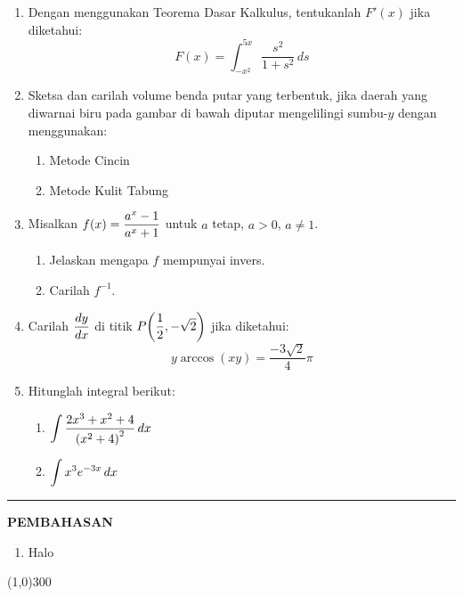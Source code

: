 \begin{enumerate}[leftmargin=*, label={\arabic*}.]
\item Dengan menggunakan Teorema Dasar Kalkulus, tentukanlah $F'(x)$ jika diketahui:
\[
F(x) = \int_{-x^{2}}^{5x}\frac{s^{2}}{1+s^{2}}\,ds
\]
\item Sketsa dan carilah volume benda putar yang terbentuk, jika daerah yang 
diwarnai biru pada gambar di bawah diputar mengelilingi sumbu-$y$ dengan 
menggunakan:
\begin{enumerate}[label={\alph*}.]
    \item Metode Cincin
    \item Metode Kulit Tabung
\end{enumerate}
\begin{center}
\end{center}

\item Misalkan $\ds f(x)=\frac{a^{x}-1}{a^{x}+1}$ untuk $a$ tetap, $a>0$, $a\neq 1$.
\begin{enumerate}[label={\alph*}.]
    \item Jelaskan mengapa $f$ mempunyai invers.
    \item Carilah $f^{-1}$.
\end{enumerate}
\item Carilah $\ds \frac{dy}{dx}$ di titik $\ds P\brk*{\frac{1}{2},-\sqrt{2}}$ jika diketahui:
\[
y\arccos(xy) = \frac{-3\sqrt{2}}{4}\pi
\]
\item Hitunglah integral berikut:
\begin{enumerate}[label={\alph*}.]
    \item $\ds \int\frac{2x^{3}+x^{2}+4}{\brk*{x^{2}+4}^{2}}\,dx$
    \item $\ds \int x^{3}e^{-3x}\,dx$
\end{enumerate}
\end{enumerate}
\vspace{0.2cm}
\hrule height 1pt
\vspace{0.5cm}
\begin{center}
    \textbf{\large{PEMBAHASAN}}
\end{center}
\begin{enumerate}[leftmargin=*, label={\arabic*}.]
\item Halo
\end{enumerate}

\begin{center}
    \line(1,0){300}
\end{center}